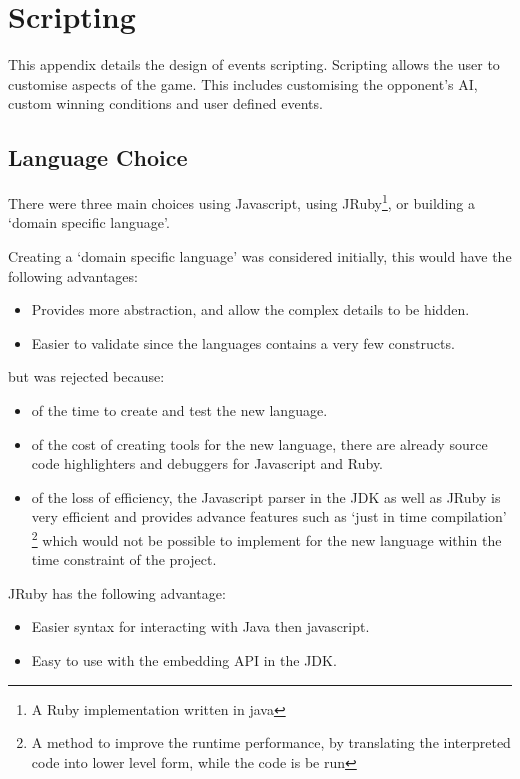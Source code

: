 \section{Scripting}
\label{sec:Scripting}
This appendix details the design of events scripting. Scripting allows the user to customise aspects of the game. This includes customising the opponent's AI, custom winning conditions and user defined events. 

\subsection{Language Choice}

There were three main choices using Javascript, using JRuby\footnote{A Ruby implementation written in java}, or building a `domain specific language'.

Creating a `domain specific language' was considered initially, this would have the following advantages:
\begin{itemize}
	\item Provides more abstraction, and allow the complex details to be hidden.
	\item Easier to validate since the languages contains a very few constructs.  
\end{itemize}

\noindent but was rejected because:

\begin{itemize}
	\item of the time to create and test the new language.
	\item of the cost of creating tools for the new language, there are already source code highlighters and debuggers for Javascript and Ruby.
	\item of the loss of efficiency, the Javascript parser in the JDK as well as JRuby is very efficient and provides advance features such as `just in time compilation' 
	\footnote{A method to improve the runtime performance, by translating the interpreted code into lower level form, while the code is be run
	}  
which would not be possible to implement for the new language within the time constraint of the project.
\end{itemize}

\noindent JRuby has the following advantage:
\begin{itemize}
	\item Easier syntax for interacting with Java then javascript.
	\item Easy to use with the embedding API in the JDK.
\end{itemize}

